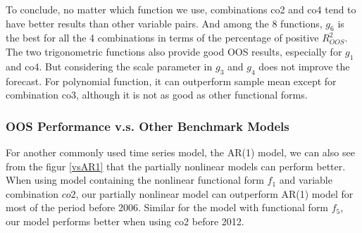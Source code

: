 \documentclass[a4paper,12pt,times,numbered,print,index]{report}
\numberwithin{equation}{section}
\begin{document}
To conclude, no matter which function we use, combinations co2 and co4 tend to have better results than other variable pairs. And among the 8 functions, $g_6$ is the best for all the 4 combinations in terms of the percentage of positive $R^2_{OOS}$. The two trigonometric functions also provide good OOS results, especially for $g_1$ and co4. But considering the scale parameter in $g_3$ and $g_4$ does not improve the forecast. For polynomial function, it can outperform sample mean except for combination co3, although it is not as good as other functional forms.

\subsubsection{OOS Performance v.s. Other Benchmark Models}
For another commonly used time series model, the AR(1) model, we can also see from the figur \ref{vsAR1} that the partially nonlinear models can perform better. When using model containing the nonlinear functional form $f_1$ and variable combination $co2$, our partially nonlinear model can outperform AR(1) model for most of the period before 2006. Similar for the model with functional form $f_5$, our model performs better when using co2 before 2012.
\end{document}
